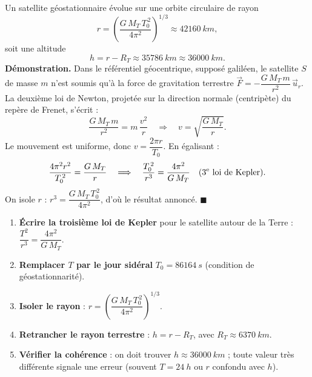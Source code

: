 \documentclass[11pt]{article}
\begin{document}
\begin{propriete}
Un satellite géostationnaire évolue sur une orbite circulaire de rayon
\[ r = \left(\dfrac{G\,M_T\,T_0^{\,2}}{4\pi^2}\right)^{1/3} \approx \SI{42160}{km}, \]
soit une altitude
\[ h = r - R_T \approx \SI{35786}{km} \approx \SI{36000}{km}. \]
\textbf{Démonstration.} Dans le référentiel géocentrique, supposé galiléen, le satellite $S$ de masse $m$ n'est soumis qu'à la force de gravitation terrestre $\vec{F} = -\dfrac{G\,M_T\,m}{r^2}\,\vec{u}_r$. La deuxième loi de Newton, projetée sur la direction normale (centripète) du repère de Frenet, s'écrit :
\[ \dfrac{G\,M_T\,m}{r^2} = m\,\dfrac{v^2}{r} \quad\Longrightarrow\quad v = \sqrt{\dfrac{G\,M_T}{r}}. \]
Le mouvement est uniforme, donc $v = \dfrac{2\pi r}{T_0}$. En égalisant :
\[ \dfrac{4\pi^2 r^2}{T_0^{\,2}} = \dfrac{G\,M_T}{r} \quad\Longrightarrow\quad \dfrac{T_0^{\,2}}{r^3} = \dfrac{4\pi^2}{G\,M_T} \quad\text{(3\textsuperscript{e} loi de Kepler)}. \]
On isole $r$ : $r^3 = \dfrac{G\,M_T\,T_0^{\,2}}{4\pi^2}$, d'où le résultat annoncé. \hfill$\blacksquare$
\end{propriete}

\begin{methode}
\begin{enumerate}
\item \textbf{Écrire la troisième loi de Kepler} pour le satellite autour de la Terre : $\dfrac{T^2}{r^3} = \dfrac{4\pi^2}{G\,M_T}$.
\item \textbf{Remplacer $T$ par le jour sidéral} $T_0 = \SI{86164}{s}$ (condition de géostationnarité).
\item \textbf{Isoler le rayon} : $r = \left(\dfrac{G\,M_T\,T_0^{\,2}}{4\pi^2}\right)^{1/3}$.
\item \textbf{Retrancher le rayon terrestre} : $h = r - R_T$, avec $R_T \approx \SI{6370}{km}$.
\item \textbf{Vérifier la cohérence} : on doit trouver $h \approx \SI{36000}{km}$ ; toute valeur très différente signale une erreur (souvent $T = \SI{24}{h}$ ou $r$ confondu avec $h$).
\end{enumerate}
\end{methode}
\end{document}
